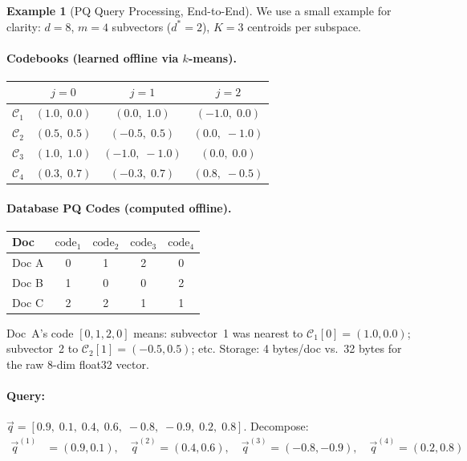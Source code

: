 \documentclass[11pt,a4paper]{article}
\theoremstyle{definition}
\newtheorem{example}{Example}[section]
\theoremstyle{plain}
\begin{document}
\begin{example}[PQ Query Processing, End-to-End]
\label{ex:pq-query-detail}
We use a small example for clarity: $d = 8$, $m = 4$ subvectors ($d^* = 2$), $K = 3$ centroids per subspace.

\paragraph{Codebooks (learned offline via $k$-means).}

\begin{center}
\begin{tabular}{cccc}
\toprule
& $j = 0$ & $j = 1$ & $j = 2$ \\
\midrule
$\mathcal{C}_1$ & $(1.0,\; 0.0)$ & $(0.0,\; 1.0)$ & $(-1.0,\; 0.0)$ \\
$\mathcal{C}_2$ & $(0.5,\; 0.5)$ & $(-0.5,\; 0.5)$ & $(0.0,\; -1.0)$ \\
$\mathcal{C}_3$ & $(1.0,\; 1.0)$ & $(-1.0,\; -1.0)$ & $(0.0,\; 0.0)$ \\
$\mathcal{C}_4$ & $(0.3,\; 0.7)$ & $(-0.3,\; 0.7)$ & $(0.8,\; -0.5)$ \\
\bottomrule
\end{tabular}
\end{center}

\paragraph{Database PQ Codes (computed offline).}

\begin{center}
\begin{tabular}{lcccc}
\toprule
\textbf{Doc} & $\mathrm{code}_1$ & $\mathrm{code}_2$ & $\mathrm{code}_3$ & $\mathrm{code}_4$ \\
\midrule
Doc A & 0 & 1 & 2 & 0 \\
Doc B & 1 & 0 & 0 & 2 \\
Doc C & 2 & 2 & 1 & 1 \\
\bottomrule
\end{tabular}
\end{center}

Doc~A's code $[0,1,2,0]$ means: subvector~1 was nearest to $\mathcal{C}_1[0] = (1.0, 0.0)$; subvector~2 to $\mathcal{C}_2[1] = (-0.5, 0.5)$; etc. Storage: 4 bytes/doc vs.\ 32 bytes for the raw 8-dim float32 vector.

\paragraph{Query:}
$\vec{q} = [0.9,\; 0.1,\; 0.4,\; 0.6,\; -0.8,\; -0.9,\; 0.2,\; 0.8]$. Decompose:
\begin{align*}
\vec{q}^{(1)} &= (0.9, 0.1),\quad \vec{q}^{(2)} = (0.4, 0.6),\quad \vec{q}^{(3)} = (-0.8, -0.9),\quad \vec{q}^{(4)} = (0.2, 0.8)
\end{align*}


\end{example}
\end{document}
